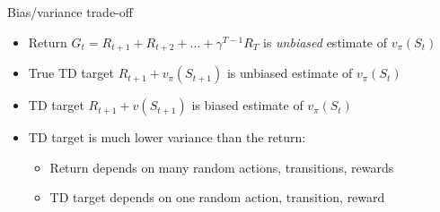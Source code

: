 \bgroup
\begin{frame}{Bias/variance trade-off}
\begin{itemize}
\item Return $G_t=R_{t+1}+R_{t+2}+\ldots+\gamma^{T-1}R_T$ is \emph{unbiased} estimate of $v_{\pi}(S_t)$
\item True TD target $R_{t+1}+v_{\pi}(S_{t+1})$ is unbiased estimate of $v_{\pi}(S_t)$
\item TD target $R_{t+1}+v(S_{t+1})$ is biased estimate of $v_{\pi}(S_t)$
\item TD target is much lower variance than the return:
\begin{itemize}
\item Return depends on many random actions, transitions, rewards
\item TD target depends on one random action, transition, reward
\end{itemize}
\end{itemize}
\end{frame}
\egroup